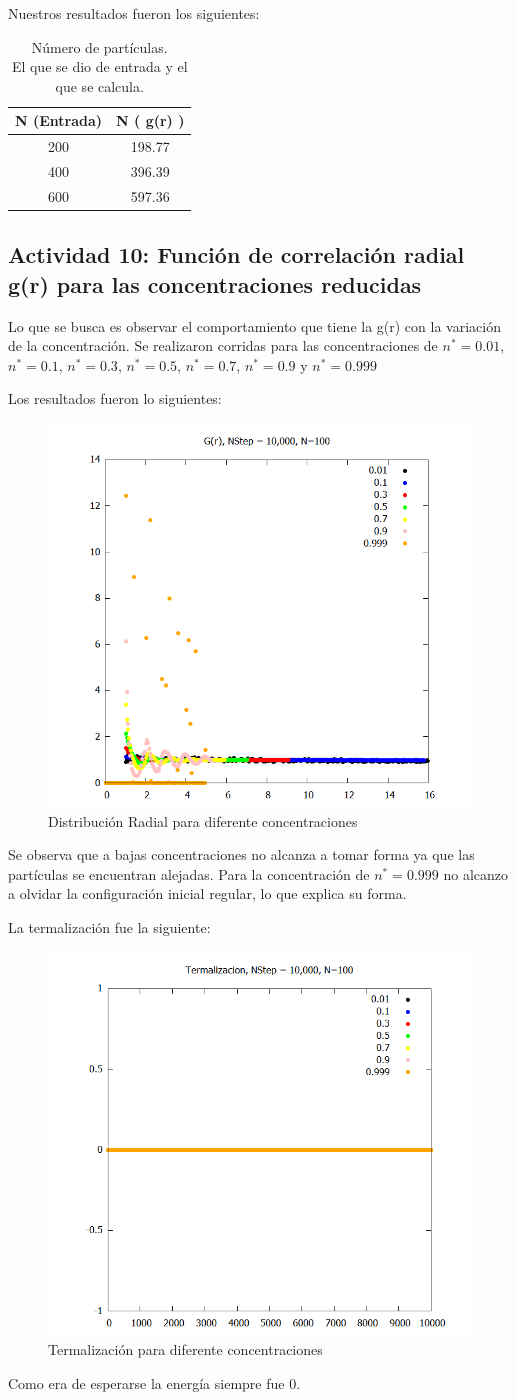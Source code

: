 \documentclass[12pt,letterpaper]{article}
\begin{document}
Nuestros resultados fueron los siguientes:
\begin{table}[H]
	\centering
	\begin{tabular}{|c|c|}
		\hline 
		N (Entrada) & N  ( g(r) ) \\ \hline 
		200 & 198.77 \\ \hline 
		400 & 396.39 \\ \hline 
		600 & 597.36 \\ \hline 
	\end{tabular} 
	\caption{Número de partículas.\\ El que se dio de entrada y el que se calcula.}
	\label{N_Particulas}
\end{table}	

\subsection*{Actividad 10: Función de correlación radial g(r) para las  concentraciones reducidas}	

Lo que se busca es observar el comportamiento que tiene la g(r) con la variación de la concentración. Se realizaron corridas para las concentraciones de $n^* = 0.01$, $n^*=0.1$, $n^*=0.3$, $n^*=0.5$, $n^*=0.7$, $n^*=0.9$ y $n^*=0.999$

Los resultados fueron lo siguientes:
\begin{figure}[H]
	\centering
	\includegraphics[width=0.50\linewidth]{gdrT.png}
	\caption{Distribución Radial para diferente concentraciones}
	\label{GDR_Cons}
\end{figure}
Se observa que a bajas concentraciones no alcanza a tomar forma ya que las partículas se encuentran alejadas. Para la concentración de $n^*=0.999$ no alcanzo a olvidar la configuración inicial regular, lo que explica su forma.

La termalización fue la siguiente:
\begin{figure}[H]
	\centering
	\includegraphics[width=0.50\linewidth]{TermaT.png}
	\caption{Termalización para diferente concentraciones}
	\label{Term_Cons}
\end{figure}
Como era de esperarse la energía siempre fue 0.
\end{document}
